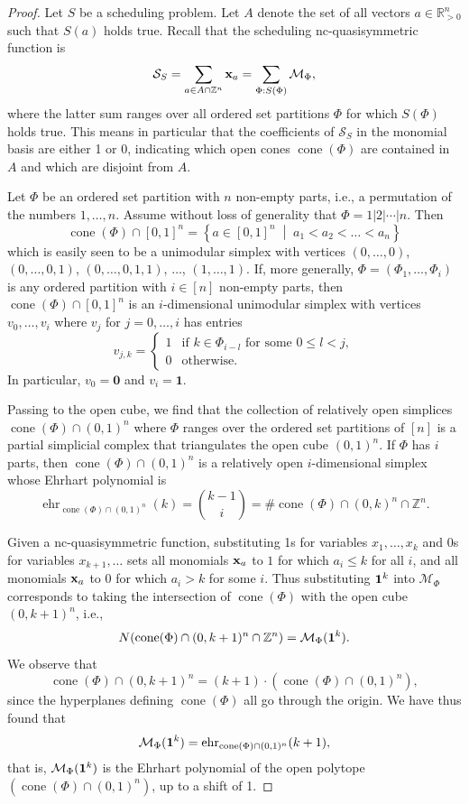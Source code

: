 \documentclass[12pt,reqno]{amsart}
\numberwithin{definition}{section}
\theoremstyle{definition}
\newcommand{\RR}{\mathbb{R}}
\newcommand{\ZZ}{\mathbb{Z}}
\newcommand{\SSS}{\mathcal{S}}
\newcommand{\ehr}{\operatorname{ehr}}
\newcommand{\cone}{\operatorname{cone}}
\newcommand{\choice}[1]{\left\{ \begin{array}{ll} #1 \end{array} \right.}
\newcommand{\mset}[2]{ \left\{ #1 \; \middle| \; #2 \right\}}
\newcommand{\ncM}{\mathcal{M}}
\newcommand{\poly}{\chi} %
\begin{document}
\begin{proof}
Let $S$ be a scheduling problem. Let $A$ denote the set of all vectors $a\in\RR^n_{> 0}$ such that $S(a)$ holds true. Recall that the scheduling nc-quasisymmetric function is
\[
 \SSS_S = \sum_{a\in A\cap\ZZ^n} {\bf{x}}_a = \sum_{\Phi:S(\Phi)} \ncM_\Phi,
\]
where the latter sum ranges over all ordered set partitions $\Phi$ for which $S(\Phi)$ holds true. This means in particular that the coefficients of $\SSS_S$ in the monomial basis are either 1 or 0, indicating which open cones $\cone(\Phi)$ are contained in $A$ and which are disjoint from $A$.

Let $\Phi$ be an ordered set partition with $n$ non-empty parts, i.e., a permutation of the numbers $1,\ldots,n$. Assume without loss of generality that $\Phi=1|2|\cdots|n$. Then
\[
  \cone(\Phi)\cap [0,1]^n = \mset{a\in[0,1]^n}{a_1<a_2<\ldots<a_n}
\]
which is easily seen to be a unimodular simplex with vertices $(0,\ldots,0)$, $(0,\ldots,0,1)$, $(0,\ldots,0,1,1)$, $\ldots$, $(1,\ldots,1)$. If, more generally, $\Phi=(\Phi_1,\ldots,\Phi_i)$ is any ordered partition with $i\in[n]$ non-empty parts, then $\cone(\Phi)\cap[0,1]^n$ is an $i$-dimensional unimodular simplex with vertices $v_0,\ldots,v_i$ where $v_j$ for $j=0,\ldots,i$ has entries 
\[
 v_{j,k} = \choice{1 & \text{if }k\in\Phi_{i-l} \text{ for some } 0\leq l < j, \\ 0 & \text{otherwise.} }
\]
In particular, $v_0= \mathbf{0}$ and $v_i=\mathbf{1}$. 

Passing to the open cube, we find that the collection of relatively open simplices $\cone(\Phi)\cap (0,1)^n$ where $\Phi$ ranges over the ordered set partitions of $[n]$ is a partial simplicial complex that triangulates the open cube $(0,1)^n$. If $\Phi$ has $i$ parts, then $\cone(\Phi)\cap (0,1)^n$ is a relatively open $i$-dimensional simplex whose Ehrhart polynomial is
\[
  \ehr_{\cone(\Phi)\cap (0,1)^n}(k) = \binom{k-1}{i} = \#\cone(\Phi)\cap (0,k)^n \cap \ZZ^n.
\] 


Given a nc-quasisymmetric function, substituting 1s for variables $x_1,\ldots,x_k$ and $0$s for variables $x_{k+1},\ldots$  sets all monomials ${\bf x}_a$ to $1$ for which $a_i \leq k$ for all $i$, and all monomials ${\bf x}_a$ to $0$ for which $a_i > k$ for some $i$. Thus substituting ${\bf 1}^k$ into $\ncM_\Phi$ corresponds to taking the intersection of $\cone(\Phi)$ with the open cube $(0,k+1)^n$, i.e.,
\[
 N(\cone(\Phi)\cap(0,k+1)^n\cap\ZZ^n) = \ncM_\Phi({\bf 1}^k).
\]
We observe that
\[
  \cone(\Phi)\cap(0,k+1)^n = (k+1)\cdot (\cone(\Phi)\cap(0,1)^n), 
\]
since the hyperplanes defining $\cone(\Phi)$ all go through the origin. We have thus found that
\begin{eqnarray}
\label{eqn:spec ncM}
  \ncM_\Phi({\bf 1}^k) 
= \ehr_{\cone(\Phi)\cap(0,1)^n}(k+1),
\end{eqnarray}
that is, $\ncM_\Phi({\bf 1}^k)$ is the Ehrhart polynomial of the open polytope $(\cone(\Phi)\cap(0,1)^n)$, up to a shift of 1. 






\end{proof}
\end{document}
